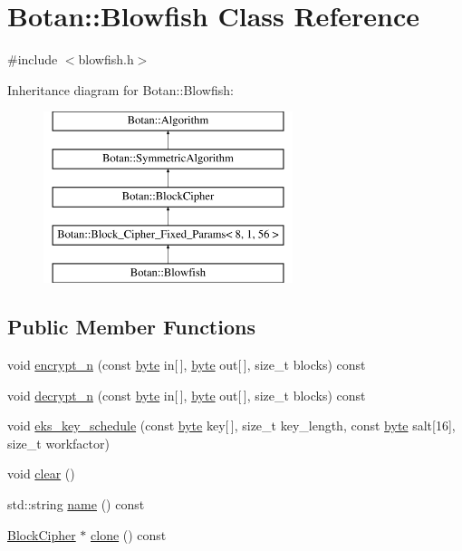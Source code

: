 \hypertarget{classBotan_1_1Blowfish}{\section{Botan\-:\-:Blowfish Class Reference}
\label{classBotan_1_1Blowfish}
}


{\ttfamily \#include $<$blowfish.\-h$>$}

Inheritance diagram for Botan\-:\-:Blowfish\-:\begin{figure}[H]
\begin{center}
\leavevmode
\includegraphics[height=5.000000cm]{classBotan_1_1Blowfish}
\end{center}
\end{figure}
\subsection*{Public Member Functions}
\begin{DoxyCompactItemize}
\item 
void \hyperlink{classBotan_1_1Blowfish_ab162152b2ddb5f2a3674f1c015dd3090}{encrypt\-\_\-n} (const \hyperlink{namespaceBotan_a7d793989d801281df48c6b19616b8b84}{byte} in\mbox{[}$\,$\mbox{]}, \hyperlink{namespaceBotan_a7d793989d801281df48c6b19616b8b84}{byte} out\mbox{[}$\,$\mbox{]}, size\-\_\-t blocks) const 
\item 
void \hyperlink{classBotan_1_1Blowfish_aaf08683263fea185fec1a3a5e7855630}{decrypt\-\_\-n} (const \hyperlink{namespaceBotan_a7d793989d801281df48c6b19616b8b84}{byte} in\mbox{[}$\,$\mbox{]}, \hyperlink{namespaceBotan_a7d793989d801281df48c6b19616b8b84}{byte} out\mbox{[}$\,$\mbox{]}, size\-\_\-t blocks) const 
\item 
void \hyperlink{classBotan_1_1Blowfish_ab99ab7a657dbae926c00f04c41379b8b}{eks\-\_\-key\-\_\-schedule} (const \hyperlink{namespaceBotan_a7d793989d801281df48c6b19616b8b84}{byte} key\mbox{[}$\,$\mbox{]}, size\-\_\-t key\-\_\-length, const \hyperlink{namespaceBotan_a7d793989d801281df48c6b19616b8b84}{byte} salt\mbox{[}16\mbox{]}, size\-\_\-t workfactor)
\item 
void \hyperlink{classBotan_1_1Blowfish_aa8c0deeb088102a43d984f3582197fd2}{clear} ()
\item 
std\-::string \hyperlink{classBotan_1_1Blowfish_a55f9b6e81fc0afe52681236f7eb47558}{name} () const 
\item 
\hyperlink{classBotan_1_1BlockCipher}{Block\-Cipher} $\ast$ \hyperlink{classBotan_1_1Blowfish_a150f9d5eef1400dbce8c9d162f6b9e6f}{clone} () const 
\end{DoxyCompactItemize}
